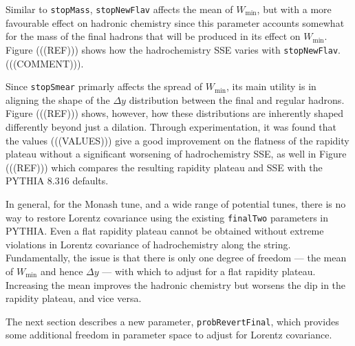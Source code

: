 \documentclass[12pt,a4paper]{report}
\begin{document}
Similar to \texttt{stopMass}, \texttt{stopNewFlav} affects the mean of $W_\text{min}$, but with a more favourable effect on hadronic chemistry since this parameter accounts somewhat for the mass of the final hadrons that will be produced in its effect on $W_\text{min}$. Figure (((REF))) shows how the hadrochemistry SSE varies with \texttt{stopNewFlav}. (((COMMENT))).

Since \texttt{stopSmear} primarly affects the spread of $W_\text{min}$, its main utility is in aligning the shape of the $\Delta y$ distribution between the final and regular hadrons. Figure (((REF))) shows, however, how these distributions are inherently shaped differently beyond just a dilation. Through experimentation, it was found that the values (((VALUES))) give a good improvement on the flatness of the rapidity plateau without a significant worsening of hadrochemistry SSE, as well in Figure (((REF))) which compares the resulting rapidity plateau and SSE with the PYTHIA 8.316 defaults.

In general, for the Monash tune, and a wide range of potential tunes, there is no way to restore Lorentz covariance using the existing \texttt{finalTwo} parameters in PYTHIA. Even a flat rapidity plateau cannot be obtained without extreme violations in Lorentz covariance of hadrochemistry along the string. Fundamentally, the issue is that there is only one degree of freedom --- the mean of $W_\text{min}$ and hence $\Delta y$ --- with which to adjust for a flat rapidity plateau. Increasing the mean improves the hadronic chemistry but worsens the dip in the rapidity plateau, and vice versa.

The next section describes a new parameter, \texttt{probRevertFinal}, which provides some additional freedom in parameter space to adjust for Lorentz covariance.
\end{document}
